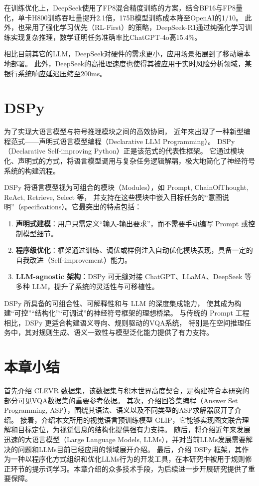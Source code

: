 在训练优化上，DeepSeek使用了FP8混合精度训练的方案，结合BF16与FP8量化，单卡H800训练吞吐量提升2.1倍，175B模型训练成本降至OpenAI的1/10。
此外，也采用了​强化学习优先（RL-First）​的策略，DeepSeek-R1通过纯强化学习训练实现复杂推理，数学证明任务准确率比ChatGPT-4o高15.4\%。

相比目前其它的LLM，DeepSeek对硬件的需求更小，应用场景拓展到了移动端本地部署。
此外，DeepSeek的高推理速度也使得其被应用于实时风险分析领域，某银行系统响应延迟压缩至200ms。
\section{DSPy}
为了实现大语言模型与符号推理模块之间的高效协同，
近年来出现了一种新型编程范式——声明式语言模型编程（Declarative LLM Programming）。
DSPy（Declarative Self-improving Python）正是该范式的代表性框架。
它通过模块化、声明式的方式，将语言模型调用与复杂任务逻辑解耦，极大地简化了神经符号系统的构建流程。

DSPy 将语言模型视为可组合的模块（Modules），如 Prompt, ChainOfThought, ReAct, Retrieve, Select 等，
并支持在这些模块中嵌入目标任务的“意图说明”（specifications）。它最突出的特点包括：
\begin{enumerate}[nosep]
\item \textbf{声明式建模}：用户只需定义“输入-输出要求”，而不需要手动编写 Prompt 或控制模型细节。
\item \textbf{程序级优化}：框架通过训练、调优或样例注入自动优化模块表现，具备一定的自我改进（Self-improvement）能力。
\item \textbf{LLM-agnostic 架构}：DSPy 可无缝对接 ChatGPT、LLaMA、DeepSeek 等多种 LLM，提升了系统的灵活性与可移植性。
\end{enumerate}

DSPy 所具备的可组合性、可解释性和与 LLM 的深度集成能力，
使其成为构建“可控”“结构化”“可调试”的神经符号框架的理想桥梁。
与传统的 Prompt 工程相比，DSPy 更适合构建语义导向、规则驱动的VQA系统，
特别是在空间推理任务中，其对规则生成、语义一致性与模型泛化能力提供了有力支持。
\section{本章小结}
首先介绍 CLEVR 数据集，该数据集与积木世界高度契合，是构建符合本研究的部分可见VQA数据集的重要参考依据。
其次，介绍回答集编程（Answer Set Programming, ASP），围绕其语法、语义以及不同类型的ASP求解器展开了介绍。
接着，介绍本文所用的视觉语言预训练模型 GLIP，它能够实现图文联合理解和目标定位，为视觉信息的结构化提供强有力支持。
随后，将介绍近年来发展迅速的大语言模型（Large Language Models, LLMs），并对当前LLMs发展需要解决的问题和LLMs目前已经应用的领域展开介绍。
最后，介绍 DSPy 框架，其作为一种以程序化方式组织和优化LLMs行为的开发工具，在本研究中被用于规则修正环节的提示词学习。本章介绍的众多技术手段，为后续进一步开展研究提供了重要保障。